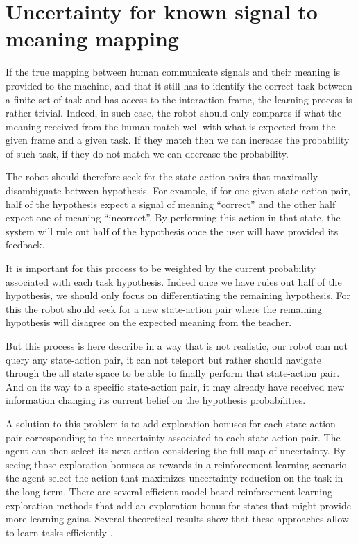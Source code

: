 \section{Uncertainty for known signal to meaning mapping}

If the true mapping between human communicate signals and their meaning is provided to the machine, and that it still has to identify the correct task between a finite set of task and has access to the interaction frame, the learning process is rather trivial. Indeed, in such case, the robot should only compares if what the meaning received from the human match well with what is expected from the given frame and a given task. If they match then we can increase the probability of such task, if they do not match we can decrease the probability.

The robot should therefore seek for the state-action pairs that maximally disambiguate between hypothesis. For example, if for one given state-action pair, half of the hypothesis expect a signal of meaning ``correct'' and the other half expect one of meaning ``incorrect''. By performing this action in that state, the system will rule out half of the hypothesis once the user will have provided its feedback. 

It is important for this process to be weighted by the current probability associated with each task hypothesis. Indeed once we have rules out half of the hypothesis, we should only focus on differentiating the remaining hypothesis. For this the robot should seek for a new state-action pair where the remaining hypothesis will disagree on the expected meaning from the teacher.

But this process is here describe in a way that is not realistic, our robot can not query any state-action pair, it can not teleport but rather should navigate through the all state space to be able to finally perform that state-action pair. And on its way to a specific state-action pair, it may already have received new information changing its current belief on the hypothesis probabilities.

A solution to this problem is to add exploration-bonuses for each state-action pair corresponding to the uncertainty associated to each state-action pair. The agent can then select its next action considering the full map of uncertainty. By seeing those exploration-bonuses as rewards in a reinforcement learning scenario the agent select the action that maximizes uncertainty reduction on the task in the long term. There are several efficient model-based reinforcement learning exploration methods that add an exploration bonus for states that might provide more learning gains. Several theoretical results show that these approaches allow to learn tasks efficiently \cite{brafman2003r,kolter2009near}. 

